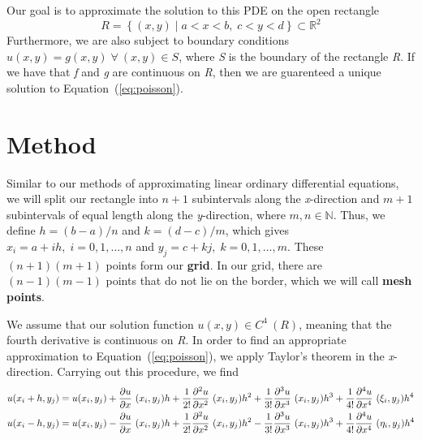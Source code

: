 \documentclass[12pt, titlepage]{article}
\begin{document}
    Our goal is to approximate the solution to this PDE on the open rectangle 
    \begin{equation*}
        R = \left\{(x,y)\; |\; a < x < b,\; c < y < d\right\} \subset \mathbb{R}^2
    \end{equation*}
    Furthermore, we are also subject to boundary conditions $u(x,y) = g(x,y)\;\forall\:(x,y)\in S$, where \textit{S} is
    the boundary of the rectangle \textit{R}. If we have that \textit{f} and \textit{g} are continuous on \textit{R}, then 
    we are guarenteed a unique solution to Equation~(\ref{eq:poisson}).
    \section*{Method}
    Similar to our methods of approximating linear ordinary differential equations, we will split our rectangle into
    $n+1$ subintervals along the \textit{x}-direction and $m+1$ subintervals of equal length along the \textit{y}-direction, where $m,n \in \mathbb{N}$.
    Thus, we define $h=(b-a)/n$ and $k=(d-c)/m$, which gives $x_i = a  + ih,\; i=0,1,\dots,n$ and $y_j = c + kj, \; k=0,1,\dots,m$. These $(n+1)(m+1)$ points
    form our \textbf{grid}. In our grid, there are $(n-1)(m-1)$ points that do not lie on the border, which we will call \textbf{mesh points}.

    We assume that our solution function $u(x,y) \in C^4~(R)$, meaning that the fourth derivative is continuous on \textit{R}. In order to find an appropriate approximation to Equation~(\ref{eq:poisson}),
    we apply Taylor's theorem in the \textit{x}-direction. Carrying out this procedure, we find
    \small
    \begin{align*}
        u(x_i + h, y_j) &= u(x_i, y_j) + \pdv{u}{x}~(x_i,y_j)h+\frac{1}{2!}\pdv[2]{u}{x}~(x_i,y_j)h^2+\frac{1}{3!}\pdv[3]{u}{x}~(x_i,y_j)h^3+\frac{1}{4!}\pdv[4]{u}{x}~(\xi_i,y_j)h^4\\
        u(x_i - h, y_j) &= u(x_i, y_j) - \pdv{u}{x}~(x_i,y_j)h+\frac{1}{2!}\pdv[2]{u}{x}~(x_i,y_j)h^2-\frac{1}{3!}\pdv[3]{u}{x}~(x_i,y_j)h^3+\frac{1}{4!}\pdv[4]{u}{x}~(\eta_i,y_j)h^4
    \end{align*}
    \normalsize

    \newpage 
    
    {}
\end{document}
